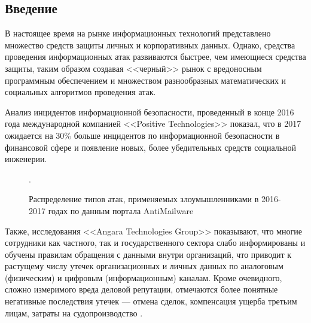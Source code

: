 \newpage
\parindent=1cm %
\begin{center}
	\section*{Введение} %
	\pagestyle{plain} %
	\setcounter{page}{3} %
\end{center}

В настоящее время на рынке информационных технологий представлено множество средств защиты личных и корпоративных данных. Однако, средства проведения информационных атак  развиваются  быстрее, чем имеющиеся средства защиты, таким образом создавая <<черный>>  рынок с вредоносным программным обеспечением  и множеством разнообразных математических и социальных  алгоритмов проведения атак. 

Анализ инцидентов информационной безопасности, проведенный в конце 2016 года международной компанией <<Positive Technologies>> показал, что в 2017 ожидается на 30\% больше инцидентов по информационной безопасности в финансовой сфере и появление новых, более убедительных средств социальной инженерии.\cite{AntiMail1} %
\begin{figure*}[h!]
	\caption{ Распределение типов атак, применяемых злоумышленниками в 2016-2017 годах по данным портала AntiMailware \cite{AntiMail1}}.
\end{figure*} 
Также, исследования  <<Angara Technologies Group>> 
показывают, что многие сотрудники  как частного, так и государственного сектора слабо информированы и обучены правилам обращения с данными внутри организаций, что приводит к растущему числу утечек организационных и личных данных по аналоговым (физическим)  и цифровым (информационным) каналам.  Кроме очевидного,  сложно измеримого вреда деловой репутации, отмечаются  более понятные негативные последствия утечек — отмена сделок, компенсация ущерба третьим лицам, затраты на судопроизводство \cite{AntiMail2}. %

